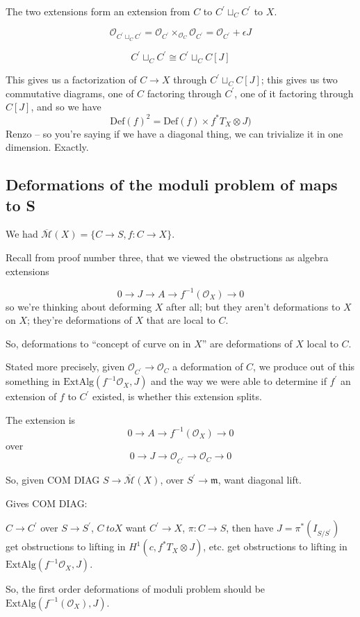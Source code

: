 \documentclass{amsart}
\theoremstyle{definition}
\newcommand{\Def}{\text{Def}}
\newcommand{\OO}{\mathcal{O}}
\newcommand{\Mbar}{\overline{\mathcal{M}}}
\begin{document}
The two extensions form an extension from $C$ to $C^\prime\sqcup_C C^\prime$ to $X$.

$$\OO_{C^\prime\sqcup_C C^\prime}=\OO_{C^\prime}\times_{\OO_C}\OO_{C^\prime}=\OO_{C^\prime}+\epsilon J$$

$$C^\prime\sqcup_C C^\prime\cong C^\prime \sqcup_C C[J]$$

This gives us a factorization of $C\to X$ through $C^\prime \sqcup_C C[J]$; this gives us two commutative diagrams, one of $C$ factoring through $C^\prime$, one of it factoring through $C[J]$, and so we have
$$\Def(f)^2=\Def(f)\times f^*T_X\otimes J)$$
Renzo -- so you're saying if we have a diagonal thing, we can trivialize it in one dimension.  Exactly.


\subsection{Deformations of the moduli problem of maps to S}

We had $\Mbar(X)=\{C\to S, f:C\to X\}$.

Recall from proof number three, that we viewed the obstructions as algebra extensions 

$$0\to J\to A\to f^{-1}(\OO_X)\to 0$$
so we're thinking about deforming $X$ after all; but they aren't deformations to $X$ on $X$; they're deformations of $X$ that are local to $C$.

So, deformations to ``concept of curve on in $X$'' are deformations of $X$ local to $C$.

Stated more precisely, given $\OO_{C^\prime}\to\OO_C$ a deformation of $C$, we produce out of this something in $\text{ExtAlg}(f^{-1}\OO_X, J)$
and the way we were able to determine if $f^\prime$ an extension of $f$ to $C^\prime$ existed, is whether this extension splits.


The extension is $$0\to A\to f^{-1}(\OO_X)\to 0$$
over
$$0\to J\to \OO_{C^\prime}\to \OO_C\to 0$$

So, given COM DIAG $S\to \Mbar(X)$, over $S^\prime\to \mathfrak{m}$, want diagonal lift.


Gives
COM DIAG:

$C\to C^\prime$ over $S\to S^\prime$, $C\ to X$ want $C^\prime \to X$, $\pi:C\to S$, then have
$J=\pi^*(I_{S/S^\prime})$ get obstructions to lifting in
$H^1(c, f^*T_X\otimes J)$, etc.
get obstructions to lifting in
$\text{ExtAlg}(f^{-1}\OO_X, J)$.


So, the first order deformations of moduli problem should be
$\text{ExtAlg}(f^{-1}(\OO_X), J)$.
\end{document}
